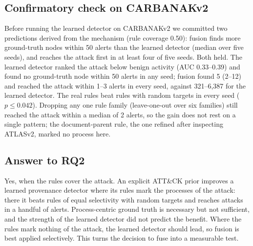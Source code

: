 \documentclass[acmlarge,screen,review]{acmart}
\begin{document}
\subsection{Confirmatory check on CARBANAKv2}\label{sec:carbanak}
Before running the learned detector on CARBANAKv2 we committed two predictions derived from the mechanism (rule
coverage 0.50): fusion finds more ground-truth nodes within 50 alerts than the learned detector (median over five
seeds), and reaches the attack first in at least four of five seeds. Both held. The learned detector ranked the attack
below benign activity (AUC 0.33--0.39) and found no ground-truth node within 50 alerts in any seed; fusion found 5
(2--12) and reached the attack within 1--3 alerts in every seed, against 321--6{,}387 for the learned detector. The
real rules beat rules with random targets in every seed ($p\le0.042$). Dropping any one rule family
(leave-one-out over six families) still reached the attack within a median of 2 alerts, so the gain does not rest on
a single pattern; the document-parent rule, the one refined after inspecting ATLASv2, marked no process here.

\subsection{Answer to RQ2}
Yes, when the rules cover the attack. An explicit ATT\&CK prior improves a learned provenance detector where its
rules mark the processes of the attack: there it beats rules of equal selectivity with random targets and reaches
attacks in a handful of alerts. Process-centric ground truth is necessary but not sufficient, and the strength of the
learned detector did not predict the benefit. Where the rules mark nothing of the attack, the learned detector should
lead, so fusion is best applied selectively. This turns the decision to fuse into a measurable test.
\end{document}
